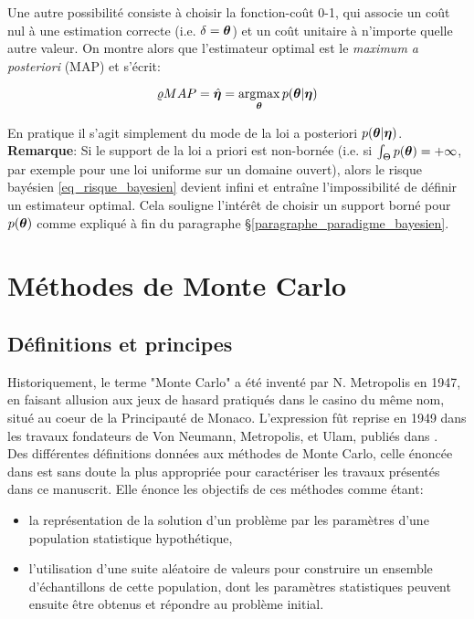 Une autre possibilité consiste à choisir la fonction-coût 0-1, qui associe un coût nul à une estimation correcte (i.e. $\delta = {\bm{\theta}}$) et un coût unitaire à n'importe quelle autre valeur. On montre alors que l'estimateur optimal est le \textit{maximum a posteriori} (MAP) et s'écrit: 

\begin{equation}
\varrho{MAP} = \hat{{\bm{\eta}}} = \operatorname*{\arg\!\max}_{{\bm{\theta}}} {p({\bm{\theta}} | {\bm{\eta}})}
\label{eq_definition_map}
\end{equation}

En pratique il s'agit simplement du mode de la loi a posteriori ${p({\bm{\theta}} | {\bm{\eta}})}$.\\

\textbf{Remarque}: Si le support de la loi a priori est non-bornée (i.e. si $\int_{\Theta}p({\bm{\theta}}) = +\infty$, par exemple pour une loi uniforme sur un domaine ouvert), alors le risque bayésien \eqref{eq_risque_bayesien} devient infini et entraîne l'impossibilité de définir un estimateur optimal. Cela souligne l'intérêt de choisir un support borné pour $p({\bm{\theta}})$ comme expliqué à fin du paragraphe §\ref{paragraphe_paradigme_bayesien}.\\


\section{Méthodes de Monte Carlo}

\subsection{Définitions et principes}

Historiquement, le terme "Monte Carlo" a été inventé par N. Metropolis en 1947, en faisant allusion aux jeux de hasard pratiqués dans le casino du même nom, situé au coeur de la Principauté de Monaco. L'expression fût reprise en 1949 dans les travaux fondateurs de Von Neumann, Metropolis, et Ulam, publiés dans \cite{Metropolis1949}.\\

Des différentes définitions données aux méthodes de Monte Carlo, celle énoncée dans \cite{Halton1970} est sans doute la plus appropriée pour caractériser les travaux présentés dans ce manuscrit. Elle énonce les objectifs de ces méthodes comme étant: \\

\begin{itemize}
	\item la représentation de la solution d'un problème par les paramètres d'une population statistique hypothétique,
	\item l'utilisation d'une suite aléatoire de valeurs pour construire un ensemble d'échantillons de cette population, dont les paramètres statistiques peuvent ensuite être obtenus et répondre au problème initial.\\
\end{itemize}
	
